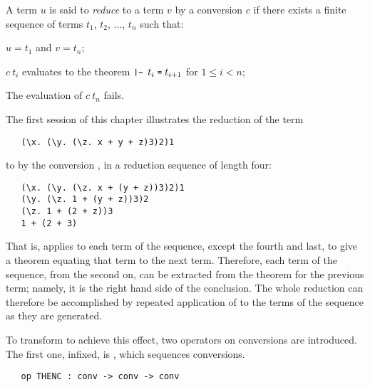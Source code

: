 A term $u$ is said to {\it reduce\/} to a term $v$ by a conversion $c$ if
there exists a
finite sequence of terms $t_1$, $t_2$, $\ldots$, $t_n$ such that:
\begin{myenumerate}
\item $u = t_1$ and $v = t_n$;
\item $c\ t_i$ evaluates to the theorem
$\ml{|- }t_i\;\ml{=}\;t_{i+1}$ for $1\leq i < n$;
\item The evaluation of $c\ t_n$ fails.
\end{myenumerate}

\noindent The first session of this chapter illustrates the reduction of
the term

\begin{hol}
\begin{verbatim}
   (\x. (\y. (\z. x + y + z)3)2)1
\end{verbatim}
\end{hol}

\noindent to  by the
conversion , in a reduction sequence of length four:

\begin{hol}
\begin{verbatim}
   (\x. (\y. (\z. x + (y + z))3)2)1
   (\y. (\z. 1 + (y + z))3)2
   (\z. 1 + (2 + z))3
   1 + (2 + 3)
\end{verbatim}
\end{hol}

\noindent That is,  applies to each term of the sequence,
except the fourth and last, to give a theorem equating that term to
the next term. Therefore, each term of the sequence, from the second
on, can be extracted from the theorem for the previous term; namely,
it is the right hand side of the conclusion.  The whole reduction can
therefore be accomplished by repeated application of 
to the terms of the sequence as they are generated.

 To transform  to
achieve this effect, two operators on
conversions are introduced.  The
first one, infixed, is , which sequences conversions.

\begin{boxed}
\begin{verbatim}
   op THENC : conv -> conv -> conv
\end{verbatim}
\end{boxed}

